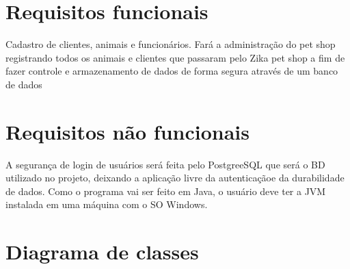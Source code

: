 \documentclass[12pt]{article}
\begin{document}
 \section{Requisitos funcionais}%
 Cadastro de clientes, animais e funcionários. Fará a administração do pet shop registrando todos os animais e clientes que passaram pelo Zika pet shop a fim de fazer controle e armazenamento de dados de forma segura através de um banco de dados
 
 
 \section{Requisitos não funcionais}%
 A segurança de login de usuários será feita pelo PostgreeSQL que será o BD utilizado no projeto, deixando a aplicação livre da autenticaçãoe da durabilidade de dados. Como o programa vai ser feito em Java, o usuário deve ter a JVM instalada em uma máquina com o SO Windows.
  
 \section{Diagrama de classes}
 
 
\end{document}
